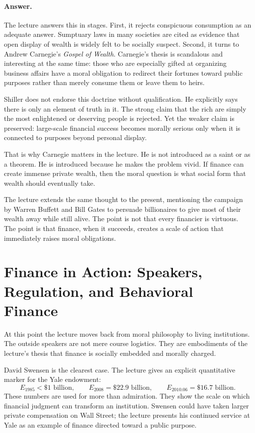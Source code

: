 \paragraph{Answer.}
The lecture answers this in stages. First, it rejects conspicuous consumption as an adequate answer. Sumptuary laws in many societies are cited as evidence that open display of wealth is widely felt to be socially suspect. Second, it turns to Andrew Carnegie's \emph{Gospel of Wealth}. Carnegie's thesis is scandalous and interesting at the same time: those who are especially gifted at organizing business affairs have a moral obligation to redirect their fortunes toward public purposes rather than merely consume them or leave them to heirs.

Shiller does not endorse this doctrine without qualification. He explicitly says there is only an element of truth in it. The strong claim that the rich are simply the most enlightened or deserving people is rejected. Yet the weaker claim is preserved: large-scale financial success becomes morally serious only when it is connected to purposes beyond personal display.

That is why Carnegie matters in the lecture. He is not introduced as a saint or as a theorem. He is introduced because he makes the problem vivid. If finance can create immense private wealth, then the moral question is what social form that wealth should eventually take.

The lecture extends the same thought to the present, mentioning the campaign by Warren Buffett and Bill Gates to persuade billionaires to give most of their wealth away while still alive. The point is not that every financier is virtuous. The point is that finance, when it succeeds, creates a scale of action that immediately raises moral obligations.

\section{Finance in Action: Speakers, Regulation, and Behavioral Finance}

At this point the lecture moves back from moral philosophy to living institutions. The outside speakers are not mere course logistics. They are embodiments of the lecture's thesis that finance is socially embedded and morally charged.

David Swensen is the clearest case. The lecture gives an explicit quantitative marker for the Yale endowment:
\begin{equation}
E_{1985}<\$1\text{ billion},\qquad
E_{2008}=\$22.9\text{ billion},\qquad
E_{2010.06}=\$16.7\text{ billion}.
\end{equation}
These numbers are used for more than admiration. They show the scale on which financial judgment can transform an institution. Swensen could have taken larger private compensation on Wall Street; the lecture presents his continued service at Yale as an example of finance directed toward a public purpose.

